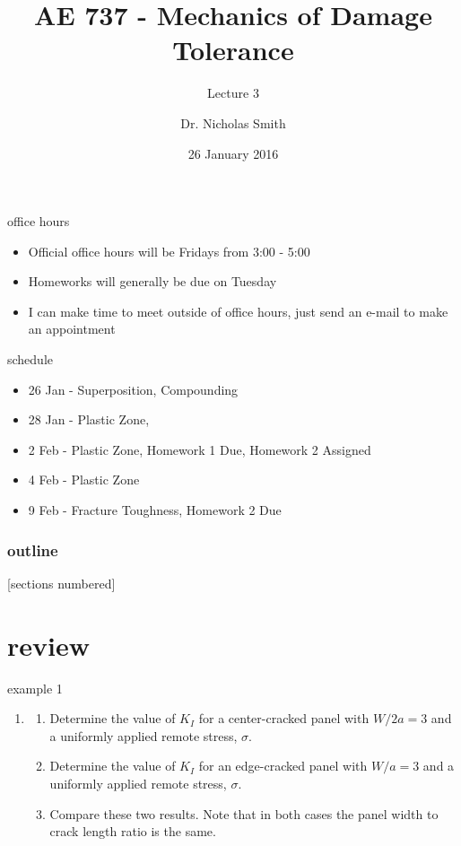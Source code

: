 \documentclass[10pt,handout]{beamer}
\title{AE 737 - Mechanics of Damage Tolerance}
\subtitle{Lecture 3}
\date{26 January 2016}
\author{Dr. Nicholas Smith}
\institute{Wichita State University, Department of Aerospace Engineering}
\begin{document}
\maketitle

\begin{frame}{office hours}
	\begin{itemize}
		\item Official office hours will be Fridays from 3:00 - 5:00
		\item Homeworks will generally be due on Tuesday
		\item I can make time to meet outside of office hours, just send an e-mail to make an appointment
	\end{itemize}
\end{frame}

\begin{frame}{schedule}
	\begin{itemize}
		\item 26 Jan - Superposition, Compounding
		\item 28 Jan - Plastic Zone, 
		\item 2 Feb - Plastic Zone, Homework 1 Due, Homework 2 Assigned
		\item 4 Feb - Plastic Zone
		\item 9 Feb - Fracture Toughness, Homework 2 Due
	\end{itemize}
\end{frame}

\begin{frame}
  \frametitle{outline}
  [sections numbered]
  \tableofcontents[hideallsubsections]
\end{frame}

\section{review}

\begin{frame}{example 1}
	\begin{enumerate}
		\item 
		\begin{enumerate}
			\item Determine the value of $K_I$ for a center-cracked panel with $W/2a = 3$ and a uniformly applied remote stress, $\sigma$.
			\item Determine the value of $K_I$ for an edge-cracked panel with $W/a = 3$ and a uniformly applied remote stress, $\sigma$.
			\item Compare these two results. Note that in both cases the panel width to crack length ratio is the same.
		\end{enumerate}
	\end{enumerate}
\end{frame}
\end{document}
